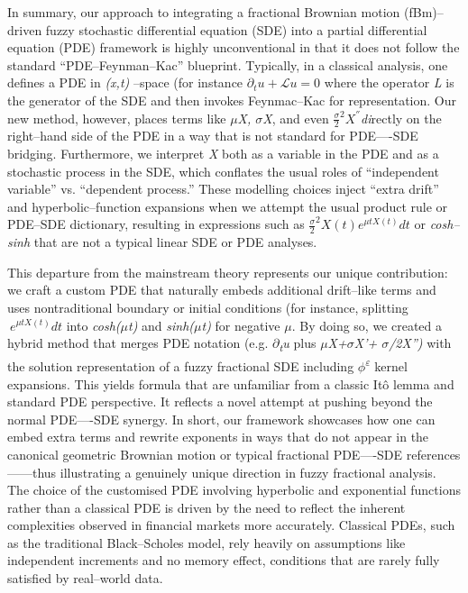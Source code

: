 \documentclass[12pt,a4paper]{report}
\numberwithin{equation}{section}
\begin{document}
In summary, our approach to integrating a fractional Brownian motion
(fBm)--driven fuzzy stochastic differential equation (SDE) into a
partial differential equation (PDE) framework is highly unconventional
in that it does not follow the standard ``PDE--Feynman--Kac'' blueprint.
Typically, in a classical analysis, one defines a PDE in \emph{(x,t)}
--space (for instance \(\partial_{t} u + \mathcal{L}u = 0\) where the
operator \emph{L} is the generator of the SDE and
then invokes Feynmac--Kac for representation.  Our new
method, however, places terms like \emph{$\mu$X, $\sigma$X}, and even
\(\frac{\sigma}{2}^{2} X^{''}\)\emph{di}rectly on the right--hand side of
the PDE in a way that is not standard for PDE----SDE bridging.
Furthermore, we interpret \emph{X} both as a variable in the PDE and as
a stochastic process in the SDE, which conflates the usual roles of
``independent variable'' vs. ``dependent process.'' These modelling
choices inject ``extra drift'' and hyperbolic--function expansions when
we attempt the usual product rule or PDE--SDE dictionary, resulting in
expressions such as \(\frac{\sigma}{2}^{2}X(t)e^{\mu tX(t)}dt\) or
\emph{cosh--sinh} that are not a typical linear SDE or PDE analyses.

This departure from the mainstream theory represents our unique
contribution: we craft a custom PDE that naturally embeds additional
drift--like terms and uses nontraditional boundary or initial conditions
(for instance, splitting\({\ e}^{\mu tX(t)}dt\) into \emph{cosh($\mu$t)} and
\emph{sinh($\mu$t)} for negative \emph{$\mu$}. By doing so, we created a hybrid
method that merges PDE notation (e.g. \emph{$\partial$\textsubscript{t}u} plus
\emph{$\mu$X+$\sigma$X'+ $\sigma$/2X'')} with the solution representation of a fuzzy
fractional SDE including \emph{$\phi$\textsuperscript{$\varepsilon$}} kernel expansions.
This yields formula that are unfamiliar from a classic Itô lemma and
standard PDE perspective. It reflects a novel attempt at pushing beyond
the normal PDE----SDE synergy. In short, our framework showcases how one
can embed extra terms and rewrite exponents in ways that do not appear
in the canonical geometric Brownian motion or typical fractional
PDE----SDE references------thus illustrating a genuinely unique direction in
fuzzy fractional analysis. The choice of the customised PDE involving
hyperbolic and exponential functions rather than a classical PDE is
driven by the need to reflect the inherent complexities observed in
financial markets more accurately. Classical PDEs, such as the
traditional Black--Scholes model, rely heavily on assumptions like
independent increments and no memory effect, conditions that are rarely
fully satisfied by real--world data.
\end{document}
